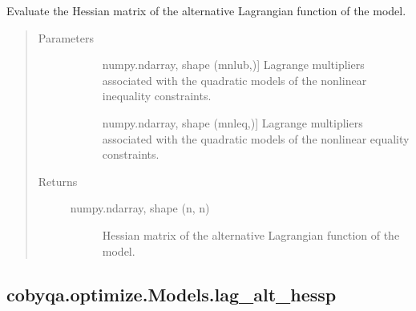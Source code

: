 \documentclass[letterpaper,10pt,english]{sphinxmanual}
\begin{document}
\begin{fulllineitems}
\begin{fulllineitems}
\label{\detokenize{refs/generated/cobyqa.optimize.Models.lag_alt_hess:cobyqa.optimize.Models.lag_alt_hess}}
\sphinxAtStartPar
Evaluate the Hessian matrix of the alternative Lagrangian function of
the model.
\begin{quote}\begin{description}
\item[{Parameters}] \leavevmode\begin{description}
\item[{}] \leavevmode{[}numpy.ndarray, shape (mnlub,){]}
\sphinxAtStartPar
Lagrange multipliers associated with the quadratic models of the
nonlinear inequality constraints.

\item[{}] \leavevmode{[}numpy.ndarray, shape (mnleq,){]}
\sphinxAtStartPar
Lagrange multipliers associated with the quadratic models of the
nonlinear equality constraints.

\end{description}

\item[{Returns}] \leavevmode\begin{description}
\item[{numpy.ndarray, shape (n, n)}] \leavevmode
\sphinxAtStartPar
Hessian matrix of the alternative Lagrangian function of the model.

\end{description}

\end{description}\end{quote}

\end{fulllineitems}



\subsection{cobyqa.optimize.Models.lag\_alt\_hessp}
\label{\detokenize{refs/generated/cobyqa.optimize.Models.lag_alt_hessp:cobyqa-optimize-models-lag-alt-hessp}}\label{\detokenize{refs/generated/cobyqa.optimize.Models.lag_alt_hessp::doc}}


\end{fulllineitems}
\end{document}
